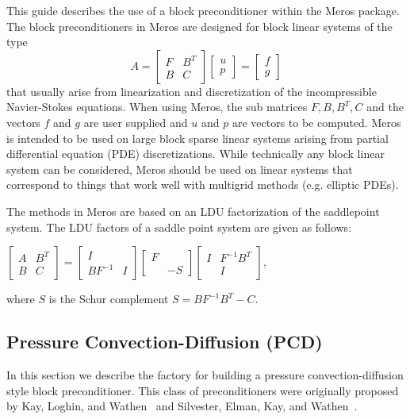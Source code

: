 This guide describes the use of a block preconditioner within the
Meros package.  The block preconditioners in Meros are designed for
block linear systems of the type
$$ A = 
\begin{bmatrix}
F & B^T \\
B & C
\end{bmatrix}
\begin{bmatrix}
u \\
p
\end{bmatrix}
=
\begin{bmatrix}
f \\
g
\end{bmatrix}
$$
that usually arise from linearization and discretization of the
incompressible Navier-Stokes equations. When using Meros, the sub
matrices $F, B, B^T, C$ and the vectors $f$ and $g$ are user supplied
and $u$ and $p$ are vectors to be computed.  Meros is intended to be
used on large block sparse linear systems arising from partial
differential equation (PDE) discretizations.  While technically any
block linear system can be considered, Meros should be used on linear
systems that correspond to things that work well with multigrid
methods (e.g. elliptic PDEs).



The methods in Meros are based on an LDU
factorization of the saddlepoint system. The LDU factors of a saddle
point system are given as follows:

$ \begin{bmatrix} A & B^T \\ B & C \end{bmatrix} = \begin{bmatrix} I &
 \\ BF^{-1} & I \end{bmatrix} \begin{bmatrix} F & \\\ & -S
 \end{bmatrix} \begin{bmatrix} I & F^{-1} B^T \\ & I \end{bmatrix}, $

where $S$ is the Schur complement $S = B F^{-1} B^T - C$.

\subsection{Pressure Convection-Diffusion (PCD)}
In this section we describe the factory for building a pressure
convection-diffusion style block preconditioner. This class of
preconditioners were originally proposed by Kay, Loghin, and
Wathen~\cite{KayLoghinWathen} and Silvester, Elman, Kay, and
Wathen~\cite{SilvesterElmanKayWathen}.

